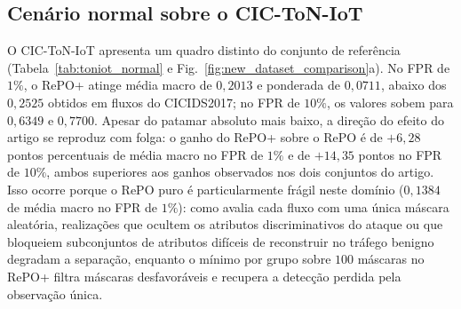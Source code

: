 \documentclass[conference]{IEEEtran}
\begin{document}
\subsection{Cenário normal sobre o CIC-ToN-IoT}

O CIC-ToN-IoT apresenta um quadro distinto do conjunto de referência (Tabela~\ref{tab:toniot_normal} e Fig.~\ref{fig:new_dataset_comparison}a).
No FPR de $1\%$, o RePO+ atinge média macro de $0{,}2013$ e ponderada de $0{,}0711$, abaixo dos $0{,}2525$ obtidos em fluxos do CICIDS2017; no FPR de $10\%$, os valores sobem para $0{,}6349$ e $0{,}7700$.
Apesar do patamar absoluto mais baixo, a direção do efeito do artigo se reproduz com folga: o ganho do RePO+ sobre o RePO é de $+6{,}28$ pontos percentuais de média macro no FPR de $1\%$ e de $+14{,}35$ pontos no FPR de $10\%$, ambos superiores aos ganhos observados nos dois conjuntos do artigo.
Isso ocorre porque o RePO puro é particularmente frágil neste domínio ($0{,}1384$ de média macro no FPR de $1\%$): como avalia cada fluxo com uma única máscara aleatória, realizações que ocultem os atributos discriminativos do ataque ou que bloqueiem subconjuntos de atributos difíceis de reconstruir no tráfego benigno degradam a separação, enquanto o mínimo por grupo sobre $100$ máscaras no RePO+ filtra máscaras desfavoráveis e recupera a detecção perdida pela observação única.
\end{document}
